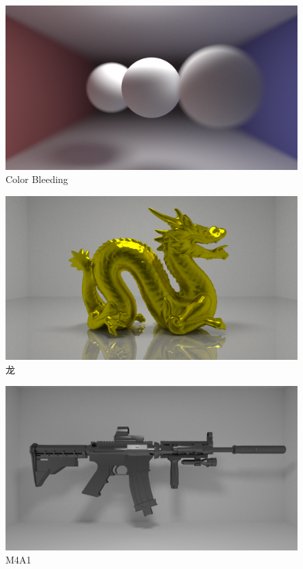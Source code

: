 \documentclass[cn]{report}
\begin{document}
    \begin{figure}[htbp]
        \centering
        \includegraphics[width=\linewidth]{../results/cornell-depth.png}
        \caption{Color Bleeding}
        \label{fig:depth}
    \end{figure}

    \begin{figure}[htbp]
        \centering
        \includegraphics[width=\linewidth]{../results/dragon.png}
        \caption{龙}
        \label{fig:dragon}
    \end{figure}

    \begin{figure}[htbp]
        \centering
        \includegraphics[width=\linewidth]{../results/m4a1.png}
        \caption{M4A1}
        \label{fig:m4a1}
    \end{figure}
\end{document}

